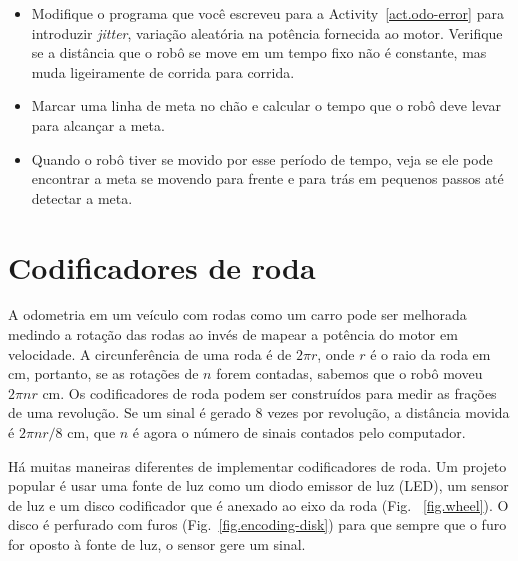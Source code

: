{\begin{framed}
\begin{itemize}
\item Modifique o programa que você escreveu para a Activity~\ref{act.odo-error} para introduzir \emph{jitter}, variação aleatória na potência fornecida ao motor. Verifique se a distância que o robô se move em um tempo fixo não é constante, mas muda ligeiramente de corrida para corrida.
\item Marcar uma linha de meta no chão e calcular o tempo que o robô deve levar para alcançar a meta.
\item Quando o robô tiver se movido por esse período de tempo, veja se ele pode encontrar a meta se movendo para frente e para trás em pequenos passos até detectar a meta.
\end{itemize}
\end{framed}

\section{Codificadores de roda}\label{s.wheel}

A odometria em um veículo com rodas como um carro pode ser melhorada medindo a rotação das rodas ao invés de mapear a potência do motor em velocidade. A circunferência de uma roda é de $2\pi r$, onde $r$ é o raio da roda em cm, portanto, se as rotações de $n$ forem contadas, sabemos que o robô moveu $2\pi n r$ cm. Os codificadores de roda podem ser construídos para medir as frações de uma revolução. Se um sinal é gerado $8$ vezes por revolução, a distância movida é $2\pi nr /8$ cm, que $n$ é agora o número de sinais contados pelo computador.

Há muitas maneiras diferentes de implementar codificadores de roda. Um projeto popular é usar uma fonte de luz como um diodo emissor de luz (LED), um sensor de luz e um disco codificador que é anexado ao eixo da roda (Fig.~ \ref{fig.wheel}). O disco é perfurado com furos (Fig.~\ref{fig.encoding-disk}) para que sempre que o furo for oposto à fonte de luz, o sensor gere um sinal.

}
